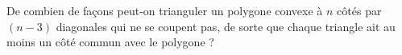 De combien de façons peut-on trianguler un polygone convexe à $n$ côtés par $(n - 3)$ diagonales qui ne se coupent pas, de sorte que chaque triangle ait au moins un côté commun avec le polygone ?
